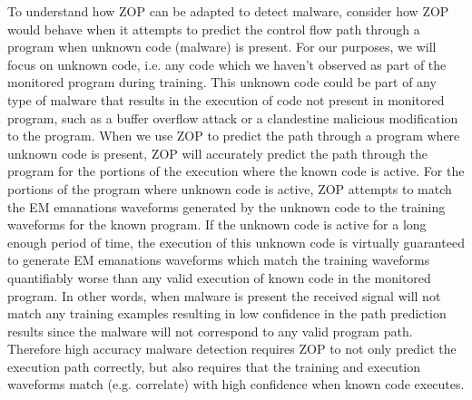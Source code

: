 To understand how ZOP can be adapted to detect malware, consider how ZOP would behave when it attempts to predict the control flow path through a program when unknown code (malware) is present. For our purposes, we will focus on unknown code, i.e. any code which we haven't observed as part of the monitored program during training. This unknown code could be part of any type of malware that results in the execution of code not present in monitored program, such as a buffer overflow attack or a clandestine malicious modification to the program. When we use ZOP to predict the path through a program where unknown code is present, ZOP will accurately predict the path through the program for the portions of the execution where the known code is active. For the portions of the program where unknown code is active, ZOP attempts to match the EM emanations waveforms generated by the unknown code to the training waveforms for the known program. If the unknown code is active for a long enough period of time, the execution of this unknown code is virtually guaranteed to generate EM emanations waveforms which match the training waveforms quantifiably worse than any valid execution of known code in the monitored program. In other words, when malware is present the received signal will not match any training examples resulting in low confidence in the path prediction results since the malware will not correspond to any valid program path. Therefore high accuracy malware detection requires ZOP to not only predict the execution path correctly, but also requires that the training and execution waveforms match (e.g. correlate) with high confidence when known code executes.

